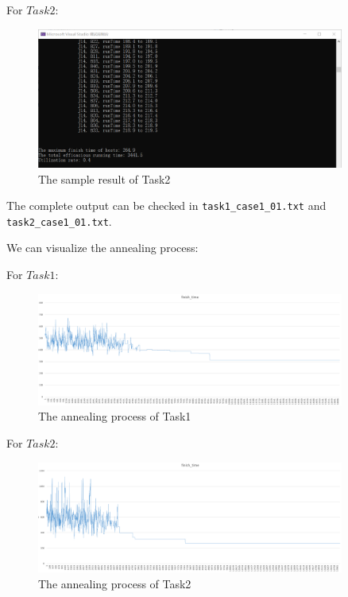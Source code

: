 \documentclass{llncs}
\begin{document}
	For $Task 2$: 
	\begin{figure}[H]
		\begin{center}
			\includegraphics[width=0.9\textwidth]{Fig-task2-res.png}
			\caption{The sample result of Task2}
			\label{Fig-task2-res}
		\end{center}
	\end{figure}
	
	The complete output can be checked in \texttt{task1\_case1\_01.txt} and \texttt{task2\_case1\_01.txt}. 
	
	We can visualize the annealing process: 
	
	For $Task 1$: 
	\begin{figure}[H]
		\begin{center}
			\includegraphics[width=0.9\textwidth]{Fig-task1-annealing.png}
			\caption{The annealing process of Task1}
			\label{Fig-task1-annealing}
		\end{center}
	\end{figure}

	For $Task 2$: 
	\begin{figure}[H]
		\begin{center}
			\includegraphics[width=0.9\textwidth]{Fig-task2-annealing.png}
			\caption{The annealing process of Task2}
			\label{Fig-task2-annealing}
		\end{center}
	\end{figure}
	
\end{document}
